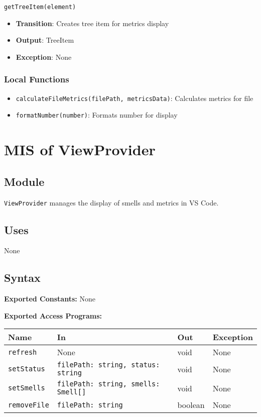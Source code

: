 \documentclass[12pt, titlepage]{article}
\begin{document}
\texttt{getTreeItem(element)}
\begin{itemize}
\item \textbf{Transition}: Creates tree item for metrics display
\item \textbf{Output}: TreeItem
\item \textbf{Exception}: None
\end{itemize}

\subsubsection{Local Functions}
\begin{itemize}
\item \texttt{calculateFileMetrics(filePath, metricsData)}: Calculates metrics for file
\item \texttt{formatNumber(number)}: Formats number for display
\end{itemize}

\section{MIS of ViewProvider}

\subsection{Module}
\texttt{ViewProvider} manages the display of smells and metrics in VS Code.

\subsection{Uses}
None

\subsection{Syntax}

\textbf{Exported Constants:} None

\textbf{Exported Access Programs:}\\
\begin{tabularx}{\linewidth}{|l|>{\raggedright\arraybackslash}X|l|l|}
  \hline
  \textbf{Name} & \textbf{In} & \textbf{Out} & \textbf{Exception} \\
  \hline
  \texttt{refresh} & None & void & None \\ \hline
  \texttt{setStatus} & \texttt{filePath: string, status: string} & void & None \\ \hline
  \texttt{setSmells} & \texttt{filePath: string, smells: Smell[]} & void & None \\ \hline
  \texttt{removeFile} & \texttt{filePath: string} & boolean & None \\
  \hline
\end{tabularx}
\end{document}
